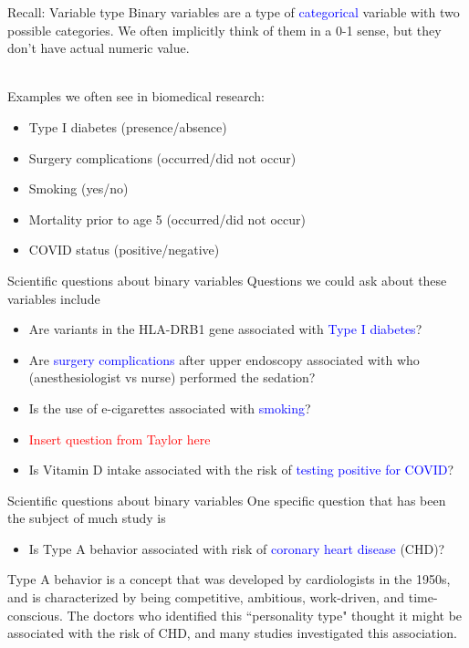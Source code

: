 \documentclass{beamer}
\begin{document}
\begin{frame}{Recall: Variable type}
Binary variables are a type of \textcolor{blue}{categorical} variable with two possible categories. We often implicitly think of them in a 0-1 sense, but they don't have actual numeric value. 
\\~\

Examples we often see in biomedical research: 
\begin{itemize}
	\item Type I diabetes (presence/absence)
	\item Surgery complications (occurred/did not occur)
	\item Smoking (yes/no)
	\item Mortality prior to age 5 (occurred/did not occur)
	\item COVID status (positive/negative)
\end{itemize}
\end{frame}

\begin{frame}{Scientific questions about binary variables}
	Questions we could ask about these variables include
	\begin{itemize}
		\item Are variants in the HLA-DRB1 gene associated with \textcolor{blue}{Type I diabetes}? 
		\item Are \textcolor{blue}{surgery complications} after upper endoscopy associated with who (anesthesiologist vs nurse) performed the sedation?
		\item Is the use of e-cigarettes associated with \textcolor{blue}{smoking}?
		\item \textcolor{red}{Insert question from Taylor here}
		\item Is Vitamin D intake associated with the risk of \textcolor{blue}{testing positive for COVID}?
	\end{itemize}
\end{frame}

\begin{frame}{Scientific questions about binary variables}
	One specific question that has been the subject of much study is 
	\begin{itemize}
		\item Is Type A behavior associated with risk of \textcolor{blue}{coronary heart disease} (CHD)?
	\end{itemize}
	\vspace{0.7cm}
	Type A behavior is a concept that was developed by cardiologists in the 1950s, and is characterized by being competitive, ambitious, work-driven, and time-conscious. The doctors who identified this ``personality type" thought it might be associated with the risk of CHD, and many studies investigated this association. 
\end{frame}
\end{document}
